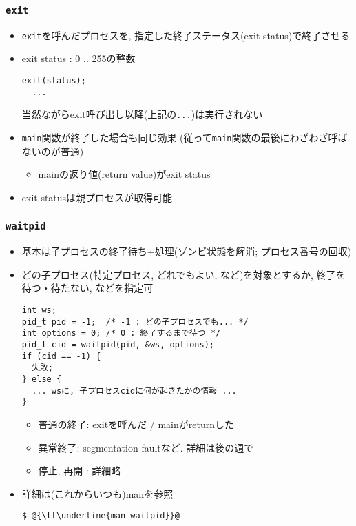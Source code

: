 \documentclass[12pt,dvipdfmx]{beamer}
\begin{document}
\begin{frame}[fragile]
\frametitle{{\tt exit}}
\begin{itemize}
\item {\tt exit}を呼んだプロセスを,
  指定した終了ステータス(exit status)で終了させる
\item exit status : 0 .. 255の整数
\begin{lstlisting}
exit(status);
  ...
\end{lstlisting}
当然ながらexit呼び出し以降(上記の{\tt ...})は実行されない
\item {\tt main}関数が終了した場合も同じ効果
  (従って{\tt main}関数の最後にわざわざ呼ばないのが普通)
  \begin{itemize}
  \item mainの返り値(return value)がexit status
  \end{itemize}
\item exit statusは親プロセスが取得可能
\end{itemize}
\end{frame}

\begin{frame}[fragile]
  \frametitle{{\tt waitpid}}
  \begin{itemize}
  \item 基本は子プロセスの終了待ち$+$処理(ゾンビ状態を解消; プロセス番号の回収)
  \item どの子プロセス(特定プロセス, どれでもよい, など)を対象とするか,
    終了を待つ・待たない, などを指定可
\begin{lstlisting}
int ws;
pid_t pid = -1;  /* -1 : どの子プロセスでも... */
int options = 0; /* 0 : 終了するまで待つ */
pid_t cid = waitpid(pid, &ws, options);
if (cid == -1) {
  失敗;
} else {
  ... wsに, 子プロセスcidに何が起きたかの情報 ...
}  
\end{lstlisting}
\begin{itemize}
\item 普通の終了: exitを呼んだ / mainがreturnした
\item 異常終了: segmentation faultなど. 詳細は後の週で
\item 停止, 再開 : 詳細略
\end{itemize}
\item 詳細は(これからいつも)manを参照
\begin{lstlisting}
$ @{\tt\underline{man waitpid}}@
\end{lstlisting} %
\end{itemize}
\end{frame}
\end{document}
